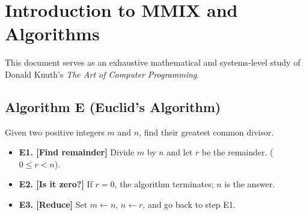 \section{Introduction to MMIX and Algorithms}

This document serves as an exhaustive mathematical and systems-level study of Donald Knuth's \textit{The Art of Computer Programming}.

\subsection{Algorithm E (Euclid's Algorithm)}
Given two positive integers $m$ and $n$, find their greatest common divisor.

\begin{itemize}
    \item \textbf{E1. [Find remainder]} Divide $m$ by $n$ and let $r$ be the remainder. ($0 \le r < n$).
    \item \textbf{E2. [Is it zero?]} If $r = 0$, the algorithm terminates; $n$ is the answer.
    \item \textbf{E3. [Reduce]} Set $m \leftarrow n$, $n \leftarrow r$, and go back to step E1.
\end{itemize}